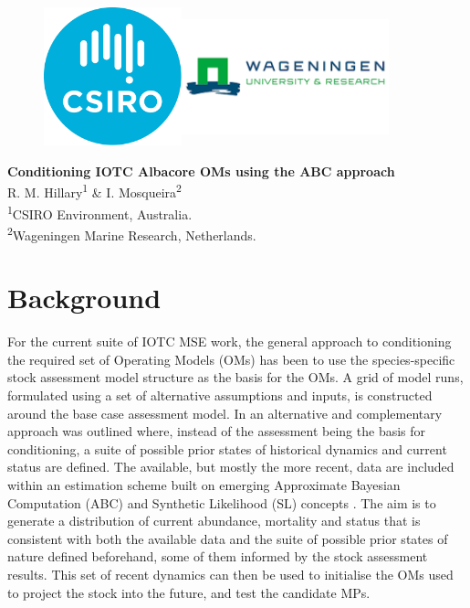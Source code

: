 \documentclass[11pt]{article}
\begin{document}

\begin{figure}[ht]
\centering  \includegraphics[width=4cm,height=4cm]{CSIRO.png}\hfill\includegraphics[width=6cm,height=4cm]{UWag.png}
\end{figure}

\vspace{0.5in}
\begin{center}
{\Large\textbf{Conditioning IOTC Albacore OMs using the
ABC approach}}\\
\vspace*{0.5in}
    R. M. Hillary\textsuperscript{1} \& I. Mosqueira\textsuperscript{2}\\
    \vspace{0.5in}
\textsuperscript{1}CSIRO Environment, Australia.\\
\textsuperscript{2}Wageningen Marine Research, Netherlands.
\end{center}

\newpage
\section{Background}

For the current suite of IOTC MSE work, the general approach to conditioning the required set of Operating Models (OMs) has been to use the species-specific stock assessment model structure as the basis for the OMs. A grid of model runs, formulated using a set of alternative assumptions and inputs, is constructed around the base case assessment model. In \cite{om21} an alternative and complementary approach was outlined where, instead of the assessment being the basis for conditioning, a suite of possible prior states of historical dynamics and current status are defined. The available, but mostly the more recent, data are included within an estimation scheme built on emerging Approximate Bayesian Computation (ABC) and Synthetic Likelihood (SL) concepts \cite{abc,synlkhd}. The aim is to generate a distribution of current abundance, mortality and status that is consistent with both the available data and the suite of possible prior states of nature defined beforehand, some of them informed by the stock assessment results. This set of recent dynamics can then be used to initialise the OMs used to project the stock into the future, and test the candidate MPs.
\end{document}
